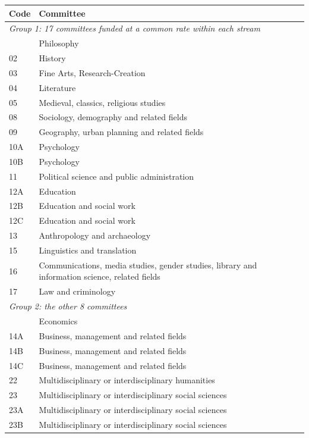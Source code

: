 \begin{tabular}{ll}
\toprule
Code & Committee \\
\midrule
\multicolumn{2}{l}{\textit{Group 1: 17 committees funded at a common rate within each stream}} \\
\addlinespace[2pt]
01 & Philosophy \\
02 & History \\
03 & Fine Arts, Research-Creation \\
04 & Literature \\
05 & Medieval, classics, religious studies \\
08 & Sociology, demography and related fields \\
09 & Geography, urban planning and related fields \\
10A & Psychology \\
10B & Psychology \\
11 & Political science and public administration \\
12A & Education \\
12B & Education and social work \\
12C & Education and social work \\
13 & Anthropology and archaeology \\
15 & Linguistics and translation \\
16 & Communications, media studies, gender studies, library and information science, related fields \\
17 & Law and criminology \\
\midrule
\multicolumn{2}{l}{\textit{Group 2: the other 8 committees}} \\
\addlinespace[2pt]
07 & Economics \\
14A & Business, management and related fields \\
14B & Business, management and related fields \\
14C & Business, management and related fields \\
22 & Multidisciplinary or interdisciplinary humanities \\
23 & Multidisciplinary or interdisciplinary social sciences \\
23A & Multidisciplinary or interdisciplinary social sciences \\
23B & Multidisciplinary or interdisciplinary social sciences \\
\bottomrule
\end{tabular}
